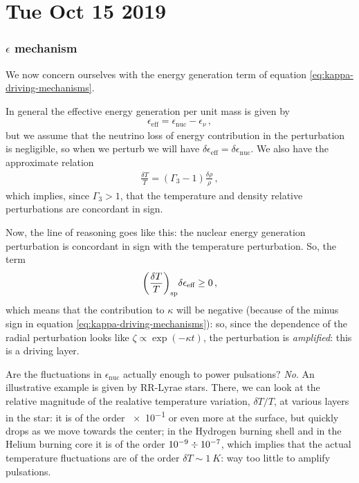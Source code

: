\documentclass[main.tex]{subfiles}
\begin{document}
\section*{Tue Oct 15 2019}

\subsubsection{\(\epsilon \) mechanism}

We now concern ourselves with the energy generation term of equation \eqref{eq:kappa-driving-mechanisms}.

In general the effective energy generation per unit mass is given by 
%
\begin{align}
\epsilon _{\text{eff}} = \epsilon _{\text{nuc}} - \epsilon _{\nu }
\,,
\end{align}
%
but we assume that the neutrino loss of energy contribution in the perturbation is negligible, so when we perturb we will have \(\delta \epsilon _{\text{eff}} = \delta \epsilon _{\text{nuc}}\). 
We also have the approximate relation 
%
\begin{align}
\frac{ \delta T}{T} = (\Gamma_3 -1 ) \frac{ \delta \rho }{\rho }
\,,
\end{align}
%
which implies, since \(\Gamma_3 >1\), that the temperature and density relative perturbations are concordant in sign.

Now, the line of reasoning goes like this: the nuclear energy generation perturbation is concordant in sign with the temperature perturbation. So, the term 
%
\begin{align}
\qty(\frac{ \delta T}{T} )_{\text{sp}} \delta \epsilon _{\text{eff}} \geq 0
\,,
\end{align}
%
which means that the contribution to \(\kappa \) will be negative (because of the minus sign in equation \eqref{eq:kappa-driving-mechanisms}): so, since the dependence of the radial perturbation looks like \(\zeta \propto \exp(-\kappa t)\), the perturbation is \emph{amplified}: this is a driving layer. 


Are the fluctuations in \(\epsilon _{\text{nuc}}\) actually enough to power pulsations? \emph{No}. 
An illustrative example is given by RR-Lyrae stars. There, we can look at the relative magnitude of the realative temperature variation, \(\delta T / T\), at various layers in the star: it is of the order \num{e-1} or even more at the surface, but quickly drops as we move towards the center; in the Hydrogen burning shell and in the Helium burning core it is of the order \(\num{e-9} \divisionsymbol \num{e-7}\), which implies that the actual temperature fluctuations are of the order \(\delta T \sim \SI{1}{K}\): way too little to amplify pulsations. 
\end{document}
